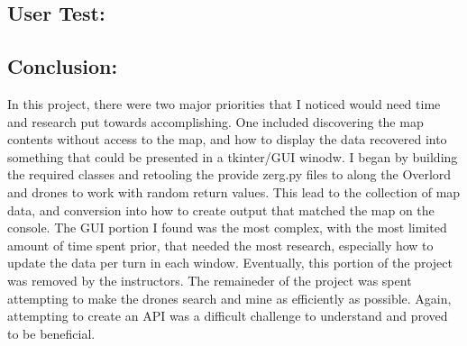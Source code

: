 \documentclass{article}
\begin{document}
    \subsection{User Test:}

\subsection{Conclusion:}
        In this project, there were two major priorities that I noticed would need time and research put towards accomplishing. One included discovering the map contents without access to the map, and how to display the data recovered into something that could be presented in a tkinter/GUI winodw.  I began by building the required classes and retooling the provide zerg.py files to along the Overlord and drones to work with random return values. This lead to the collection of map data, and conversion into how to create output that matched the map on the console. The GUI portion I found was the most complex, with the most limited amount of time spent prior, that needed the most research, especially how to update the data per turn in each window.  Eventually, this portion of the project was removed by the instructors.  The remaineder of the project was spent attempting to make the drones search and mine as efficiently as possible. Again, attempting to create an API was a difficult challenge to understand and proved to be beneficial. 
\end{document}
